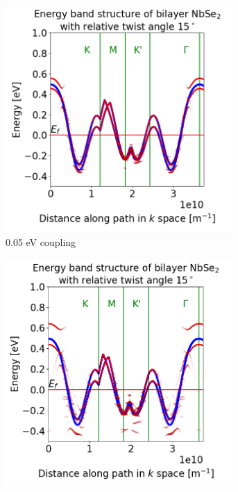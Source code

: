 \documentclass[12pt]{report} %
\begin{document}
\begin{figure}[t]
\centering
  \begin{subfigure}[b]{0.475\textwidth}
    \centering
    \includegraphics[width=0.95\textwidth]{0.05_coupling_15_deg.png}
    \caption{0.05 eV coupling}
    \label{bilayer_coupling_0.05}
  \end{subfigure}
  \hfill
  \begin{subfigure}[b]{0.475\textwidth}
    \centering
    \includegraphics[width=0.95\textwidth]{0.1_coupling_15_deg.png}

\end{subfigure}
\end{figure}
\end{document}
